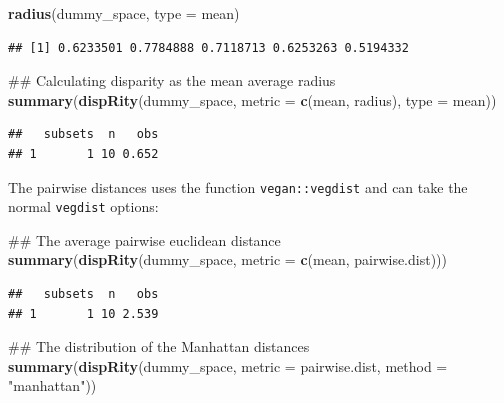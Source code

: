 \documentclass[]{book}
\newenvironment{Shaded}{\begin{snugshade}}{\end{snugshade}}
\newcommand{\KeywordTok}[1]{\textcolor[rgb]{0.13,0.29,0.53}{\textbf{#1}}}
\newcommand{\DataTypeTok}[1]{\textcolor[rgb]{0.13,0.29,0.53}{#1}}
\newcommand{\StringTok}[1]{\textcolor[rgb]{0.31,0.60,0.02}{#1}}
\newcommand{\NormalTok}[1]{#1}
\theoremstyle{definition}
\theoremstyle{definition}
\theoremstyle{remark}
\begin{document}
\begin{Shaded}
\begin{Highlighting}[]
\KeywordTok{radius}\NormalTok{(dummy_space, }\DataTypeTok{type =}\NormalTok{ mean)}
\end{Highlighting}
\end{Shaded}

\begin{verbatim}
## [1] 0.6233501 0.7784888 0.7118713 0.6253263 0.5194332
\end{verbatim}

\begin{Shaded}
\begin{Highlighting}[]
\NormalTok{## Calculating disparity as the mean average radius}
\KeywordTok{summary}\NormalTok{(}\KeywordTok{dispRity}\NormalTok{(dummy_space, }\DataTypeTok{metric =} \KeywordTok{c}\NormalTok{(mean, radius), }\DataTypeTok{type =}\NormalTok{ mean))}
\end{Highlighting}
\end{Shaded}

\begin{verbatim}
##   subsets  n   obs
## 1       1 10 0.652
\end{verbatim}

The pairwise distances uses the function \texttt{vegan::vegdist} and can
take the normal \texttt{vegdist} options:

\begin{Shaded}
\begin{Highlighting}[]
\NormalTok{## The average pairwise euclidean distance}
\KeywordTok{summary}\NormalTok{(}\KeywordTok{dispRity}\NormalTok{(dummy_space, }\DataTypeTok{metric =} \KeywordTok{c}\NormalTok{(mean, pairwise.dist)))}
\end{Highlighting}
\end{Shaded}

\begin{verbatim}
##   subsets  n   obs
## 1       1 10 2.539
\end{verbatim}

\begin{Shaded}
\begin{Highlighting}[]
\NormalTok{## The distribution of the Manhattan distances}
\KeywordTok{summary}\NormalTok{(}\KeywordTok{dispRity}\NormalTok{(dummy_space, }\DataTypeTok{metric =}\NormalTok{ pairwise.dist, }\DataTypeTok{method =} \StringTok{"manhattan"}\NormalTok{))}
\end{Highlighting}
\end{Shaded}
\end{document}
